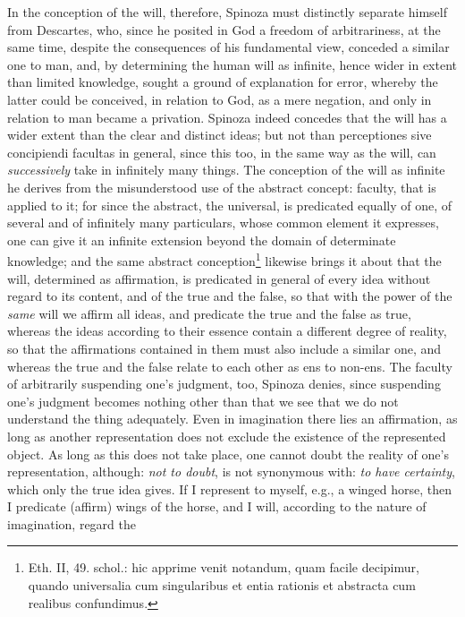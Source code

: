 \documentclass[12pt,a4paper,openany]{book}
\newcommand{\opage}[1]{\marginnote{\footnotesize\textit{[#1]}}}
\begin{document}
In the conception of the will, therefore, Spinoza must distinctly separate himself from
Descartes, who, since he posited in God a freedom of arbitrariness,
at the same time, despite the consequences of his fundamental view, conceded
a similar one to man, and, by determining the human will
as infinite, hence wider in extent than limited
knowledge, sought a ground of explanation for error, whereby
the latter could be conceived, in relation to God, as a mere negation, and only in
relation to man became a privation. Spinoza indeed concedes that
the will has a wider extent than the clear and distinct ideas; but
not than perceptiones sive concipiendi facultas in general, since
this too, in the same way as the will, can \emph{successively}
take in infinitely many things. The conception of the will as infinite he derives from
the misunderstood use of the abstract concept: faculty, that is applied
to it; for since the abstract, the universal, is predicated equally of
one, of several and of infinitely many particulars, whose common element it
expresses, one can give it an infinite extension beyond the domain of
determinate knowledge; and the same abstract
conception\footnote{Eth. II, 49. schol.: hic apprime venit notandum,
quam facile decipimur, quando universalia cum singularibus et
entia rationis et abstracta cum realibus confundimus.} likewise brings it about
that the will, determined as affirmation, is predicated in
general of every idea without regard to its content, and of the
true and the false, so that with the power of the \emph{same} will we affirm
all ideas, and predicate the true and the false as true, whereas
the ideas according to their essence contain a different degree of reality,
so that the affirmations contained in them must also include
a similar one, and whereas the true and the false relate to
each other as ens to non-ens. The faculty of arbitrarily
suspending one's judgment, too, Spinoza denies, since suspending one's judgment
becomes nothing other than that we
\opage{107}\setcounter{footnote}{0}see that we do not understand the thing adequately. Even in imagination
there lies an affirmation, as long as another representation does not
exclude the existence of the represented object. As long as this
does not take place, one cannot doubt the reality of one's representation,
although: \emph{not to doubt}, is not synonymous with:
\emph{to have certainty}, which only the true idea gives. If I represent
to myself, e.g., a winged horse, then I predicate (affirm) wings
of the horse, and I will, according to the nature of imagination, regard the
\end{document}
